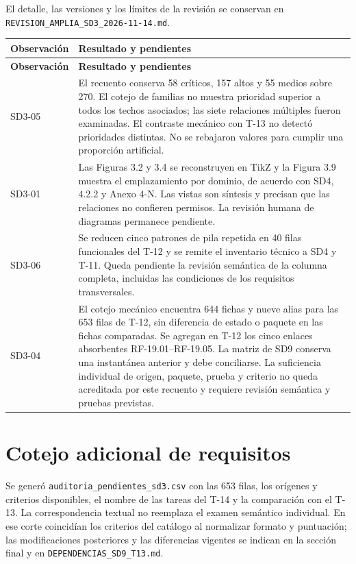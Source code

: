 \documentclass[11pt,letterpaper]{article}
\begin{document}
El detalle, las versiones y los límites de la revisión se conservan en \texttt{REVISION\_AMPLIA\_SD3\_2026-11-14.md}.
\begin{longtable}{@{}P{0.17\textwidth}P{\tabcolsep\relax}@{}}
\hline
\textbf{Observación} & \textbf{Resultado y pendientes} \\
\hline
\endfirsthead
\hline
\textbf{Observación} & \textbf{Resultado y pendientes} \\
\hline
\endhead
\hline
\endfoot
SD3-05 & El recuento conserva 58 críticos, 157 altos y 55 medios sobre 270. El cotejo de familias no muestra prioridad superior a todos los techos asociados; las siete relaciones múltiples fueron examinadas. El contraste mecánico con T-13 no detectó prioridades distintas. No se rebajaron valores para cumplir una proporción artificial. \\
SD3-01 & Las Figuras 3.2 y 3.4 se reconstruyen en TikZ y la Figura 3.9 muestra el emplazamiento por dominio, de acuerdo con SD4, 4.2.2 y Anexo 4-N. Las vistas son síntesis y precisan que las relaciones no confieren permisos. La revisión humana de diagramas permanece pendiente. \\
SD3-06 & Se reducen cinco patrones de pila repetida en 40 filas funcionales del T-12 y se remite el inventario técnico a SD4 y T-11. Queda pendiente la revisión semántica de la columna completa, incluidas las condiciones de los requisitos transversales. \\
SD3-04 & El cotejo mecánico encuentra 644 fichas y nueve alias para las 653 filas de T-12, sin diferencia de estado o paquete en las fichas comparadas. Se agregan en T-12 los cinco enlaces absorbentes RF-19.01--RF-19.05. La matriz de SD9 conserva una instantánea anterior y debe conciliarse. La suficiencia individual de origen, paquete, prueba y criterio no queda acreditada por este recuento y requiere revisión semántica y pruebas previstas. \\
\end{longtable}

\section*{Cotejo adicional de requisitos}

Se generó \texttt{auditoria\_pendientes\_sd3.csv} con las 653 filas, los orígenes y criterios disponibles, el nombre de las tareas del T-14 y la comparación con el T-13. La correspondencia textual no reemplaza el examen semántico individual. En ese corte coincidían los criterios del catálogo al normalizar formato y puntuación; las modificaciones posteriores y las diferencias vigentes se indican en la sección final y en \texttt{DEPENDENCIAS\_SD9\_T13.md}.
\end{document}

